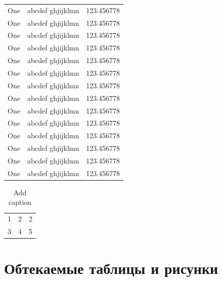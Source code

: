 \documentclass[12pt, a4paper]{article}
\begin{document}
\begin{center}
\begin{longtable}{|l|l|l|}
One & abcdef ghjijklmn & 123.456778 \\
One & abcdef ghjijklmn & 123.456778 \\
One & abcdef ghjijklmn & 123.456778 \\
One & abcdef ghjijklmn & 123.456778 \\
One & abcdef ghjijklmn & 123.456778 \\
One & abcdef ghjijklmn & 123.456778 \\
One & abcdef ghjijklmn & 123.456778 \\
One & abcdef ghjijklmn & 123.456778 \\
One & abcdef ghjijklmn & 123.456778 \\
One & abcdef ghjijklmn & 123.456778 \\
One & abcdef ghjijklmn & 123.456778 \\
One & abcdef ghjijklmn & 123.456778 \\
One & abcdef ghjijklmn & 123.456778 \\
One & abcdef ghjijklmn & 123.456778 \\
\end{longtable}
\end{center}


\begin{table}[htbp]
	\centering
	\caption{Add caption}
	\begin{tabular}{rrr}
		1     & 2     & 2 \\
		3     & 4     & 5 \\
	\end{tabular}%
	\label{tab:addlabel}%
\end{table}%



\section{Обтекаемые таблицы и рисунки}
\end{document}
